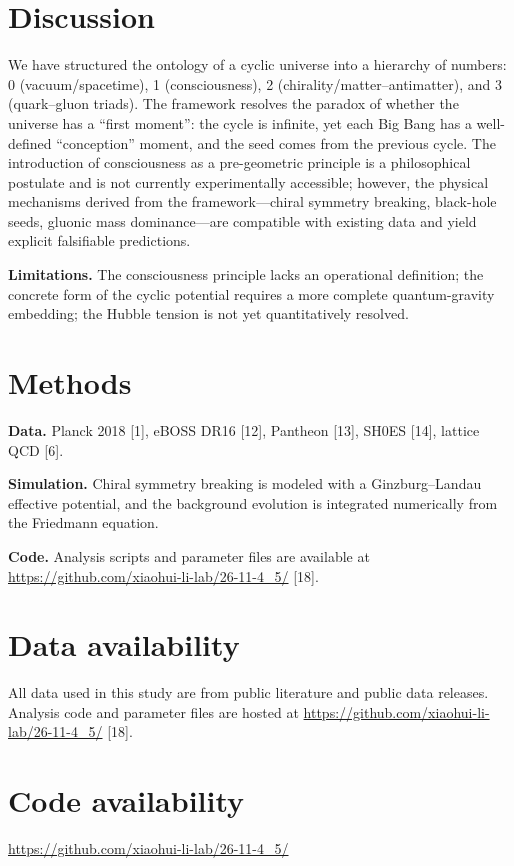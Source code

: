 \documentclass[11pt,a4paper]{article}
\begin{document}
\section{Discussion}
We have structured the ontology of a cyclic universe into a hierarchy of numbers: 0 (vacuum/spacetime), 1 (consciousness), 2 (chirality/matter--antimatter), and 3 (quark--gluon triads). The framework resolves the paradox of whether the universe has a ``first moment'': the cycle is infinite, yet each Big Bang has a well-defined ``conception'' moment, and the seed comes from the previous cycle. The introduction of consciousness as a pre-geometric principle is a philosophical postulate and is not currently experimentally accessible; however, the physical mechanisms derived from the framework---chiral symmetry breaking, black-hole seeds, gluonic mass dominance---are compatible with existing data and yield explicit falsifiable predictions.

\noindent\textbf{Limitations.} The consciousness principle lacks an operational definition; the concrete form of the cyclic potential requires a more complete quantum-gravity embedding; the Hubble tension is not yet quantitatively resolved.

\section{Methods}

\noindent\textbf{Data.} Planck 2018 [1], eBOSS DR16 [12], Pantheon [13], SH0ES [14], lattice QCD [6].

\noindent\textbf{Simulation.} Chiral symmetry breaking is modeled with a Ginzburg--Landau effective potential, and the background evolution is integrated numerically from the Friedmann equation.

\noindent\textbf{Code.} Analysis scripts and parameter files are available at \url{https://github.com/xiaohui-li-lab/26-11-4_5/} [18].

\section*{Data availability}
All data used in this study are from public literature and public data releases. Analysis code and parameter files are hosted at \url{https://github.com/xiaohui-li-lab/26-11-4_5/} [18].

\section*{Code availability}
\url{https://github.com/xiaohui-li-lab/26-11-4_5/}
\end{document}
